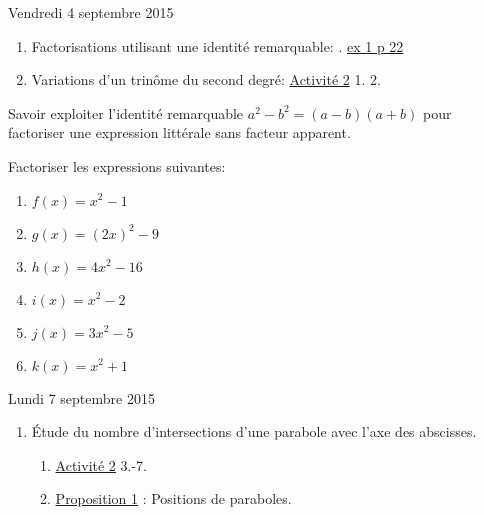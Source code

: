 \documentclass[a4paper,11pt]{article}
\theoremstyle{break}
\begin{document}
  Vendredi 4 septembre 2015
  \begin{enumerate}
   \item Factorisations utilisant une identité remarquable: .
   \href{https://github.com/mathlorgues/math1sd1516/blob/master/20150904/1-2-3p22.png}
   {ex 1 p 22}
   \item Variations d'un trinôme du second degré:
   \href{https://github.com/mathlorgues/math1sd1516/blob/master/20150904/activite.pdf}
   {Activité 2}
    1. 2.
   
  \end{enumerate}
  
   \begin{Dev}
     
     Savoir exploiter l'identité remarquable $a^2-b^2=(a-b)(a+b)$ pour factoriser 
     une expression littérale sans facteur apparent.
     
     \begin{exo}
       
    Factoriser les expressions suivantes:
    \begin{enumerate}
     \item $f(x)=x^2-1$
     \item $g(x)=(2x)^2-9$
     \item $h(x)=4x^2-16$
     \item $i(x)=x^2-2$
     \item $j(x)=3x^2-5$
     \item $k(x)=x^2+1$
    \end{enumerate}
    
     
    \end{exo}

  
  \end{Dev}
  
  \newpage
  
  Lundi 7 septembre 2015
  \begin{enumerate}
    
    \item \'Etude du nombre d'intersections d'une parabole avec l'axe des abscisses.
    \begin{enumerate}
      \item 
      \href{https://github.com/mathlorgues/math1sd1516/blob/master/20150907/activite.pdf}
   {Activité 2} 3.-7.
      \item 
      \href{https://github.com/mathlorgues/math1sd1516/blob/master/20150907/propositions.pdf}
   {Proposition 1} : Positions de paraboles.
      
    \end{enumerate}
    
    
  \end{enumerate}
  
\end{document}
